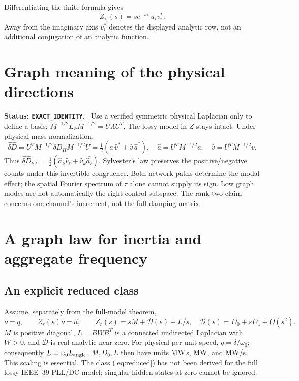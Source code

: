 \documentclass[11pt]{article}
\newcommand{\status}[1]{\par\smallskip\noindent\textbf{Status: \texttt{#1}.}\ }
\begin{document}
Differentiating the finite formula gives
\begin{equation}
 Z_{\tau_i}(s)=s e^{-s\tau_i}u_iv_i^* . \label{eq:derivative}
\end{equation}
Away from the imaginary axis $v_i^*$ denotes the displayed analytic
row, not an additional conjugation of an analytic function.

\section{Graph meaning of the physical directions}
\status{EXACT\_IDENTITY}
Use a verified symmetric physical Laplacian only to define a basis:
$M^{-1/2}L_PM^{-1/2}=U\Lambda U^T$. The lossy model in $Z$ stays intact.
Under physical mass normalization,
\[
 \widehat{\delta D}=U^TM^{-1/2}\delta D_HM^{-1/2}U
 =\tfrac12(\widehat a\,\widehat v^*+\widehat v\,\widehat a^*),
 \quad \widehat a=U^TM^{-1/2}a,\quad \widehat v=U^TM^{-1/2}v .
\]
Thus $\widehat{\delta D}_{k\ell}
=\tfrac12(\widehat a_k\overline{\widehat v_\ell}
+\widehat v_k\overline{\widehat a_\ell})$.
Sylvester's law preserves the positive/negative counts under this
invertible congruence. Both network paths determine the modal effect;
the spatial Fourier spectrum of $\tau$ alone cannot supply its sign.
Low graph modes are not automatically the right control subspace.
The rank-two claim concerns one channel's increment, not the full
damping matrix.

\section{A graph law for inertia and aggregate frequency}
\subsection{An explicit reduced class}
Assume, separately from the full-model theorem,
\begin{equation}
 \nu=\dot q,\qquad Z_r(s)\nu=d,\qquad
 Z_r(s)=sM+\mathcal D(s)+L/s,\quad
 \mathcal D(s)=D_0+sD_1+O(s^2). \label{eq:reduced}
\end{equation}
$M$ is positive diagonal, $L=BWB^T$ is a connected undirected
Laplacian with $W>0$, and $\mathcal D$ is real analytic near zero.
For physical per-unit speed, $q=\delta/\omega_0$; consequently
$L=\omega_0 L_{\rm angle}$. $M,D_0,L$ then have units MW\,s, MW,
and MW/s. This scaling is essential.
The class (\ref{eq:reduced}) has not been derived for the full lossy
IEEE--39 PLL/DC model; singular hidden states at zero cannot be ignored.
\end{document}
